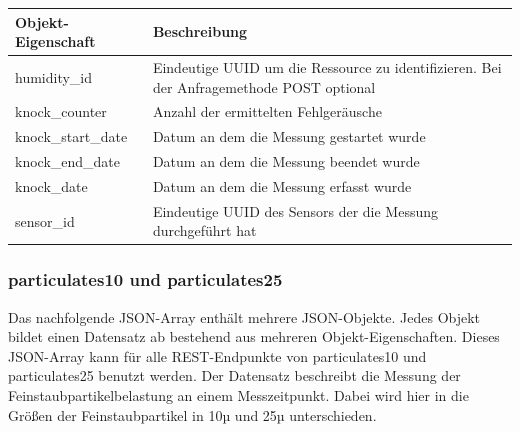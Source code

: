 \begin{table}[H]
  \begin{tabularx}{\textwidth}{lX}
    \textbf{Objekt-Eigenschaft} & \textbf{Beschreibung}                                                                     \\ \toprule
    humidity\_id                & Eindeutige UUID um die Ressource zu identifizieren. Bei der Anfragemethode POST optional  \\
    knock\_counter              & Anzahl der ermittelten Fehlgeräusche                                                      \\
    knock\_start\_date          & Datum an dem die Messung gestartet wurde                                                  \\
    knock\_end\_date            & Datum an dem die Messung beendet wurde                                                    \\
    knock\_date                 & Datum an dem die Messung erfasst wurde                                                    \\
    sensor\_id                  & Eindeutige UUID des Sensors der die Messung durchgeführt hat                              \\
  \end{tabularx}
\end{table}

\subsubsection{particulates10 und particulates25}%
\label{sec:rest.json.particulates}

Das nachfolgende JSON-Array enthält mehrere JSON-Objekte. Jedes Objekt bildet
einen Datensatz ab bestehend aus mehreren Objekt-Eigenschaften. Dieses
JSON-Array kann für alle REST-Endpunkte von particulates10 und particulates25
benutzt werden. Der Datensatz beschreibt die Messung der
Feinstaubpartikelbelastung an einem Messzeitpunkt. Dabei wird hier in die Größen
der Feinstaubpartikel in 10µ und 25µ unterschieden.

\begin{jsoncode}
\end{jsoncode}

